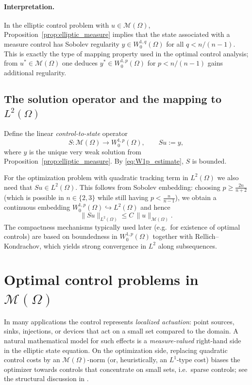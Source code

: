 \documentclass[11pt,a4paper]{article}
\begin{document}
\paragraph{Interpretation.}
In the elliptic control problem with $u\in\mathcal{M}(\Omega)$, Proposition~\ref{prop:elliptic_measure}
implies that the state associated with a measure control has Sobolev regularity
$y\in W^{1,q}_0(\Omega)$ for all $q<n/(n-1)$.
This is exactly the type of mapping property used in the optimal control analysis;
from $u^*\in\mathcal{M}(\Omega)$ one deduces $y^*\in W^{1,p}_0(\Omega)$ for $p<n/(n-1)$ gains additional regularity. 


\subsection{The solution operator and the mapping to $L^2(\Omega)$}
Define the linear \emph{control-to-state} operator
\[
S:\mathcal{M}(\Omega)\to W^{1,p}_0(\Omega),\qquad Su := y,
\]
where $y$ is the unique very weak solution from Proposition~\ref{prop:elliptic_measure}.
By \eqref{eq:W1p_estimate}, $S$ is bounded.

For the optimization problem with quadratic tracking term in $L^2(\Omega)$ we also need that
$Su\in L^2(\Omega)$. This follows from Sobolev embedding: choosing
$p\ge \frac{2n}{n+2}$ (which is possible in $n\in\{2,3\}$ while still having $p<\frac{n}{n-1}$),
we obtain a continuous embedding $W^{1,p}_0(\Omega)\hookrightarrow L^2(\Omega)$ and hence
\begin{equation}\label{eq:S_to_L2}
\|Su\|_{L^2(\Omega)} \le C\,\|u\|_{\mathcal{M}(\Omega)}.
\end{equation}
The compactness mechanisms typically used later (e.g.\ for existence of optimal controls)
are based on boundedness in $W^{1,p}_0(\Omega)$ together with Rellich--Kondrachov,
which yields strong convergence in $L^2$ along subsequences. \cite{ponceEMS}

\section{Optimal control problems in $\mathcal{M}(\Omega)$}\label{sec:primal_PM}

In many applications the control represents \emph{localized actuation}: point sources, sinks, injections, or devices that act on a small set compared to the domain.
A natural mathematical model for such effects is a \emph{measure-valued} right-hand side in the elliptic state equation.
On the optimization side, replacing quadratic control costs by an $\mathcal{M}(\Omega)$-norm (or, heuristically, an $L^1$-type cost) biases the optimizer towards controls that concentrate on small sets, i.e.\ sparse controls; see the structural discussion in \cite{ClasonKunisch2009}. 
\end{document}
